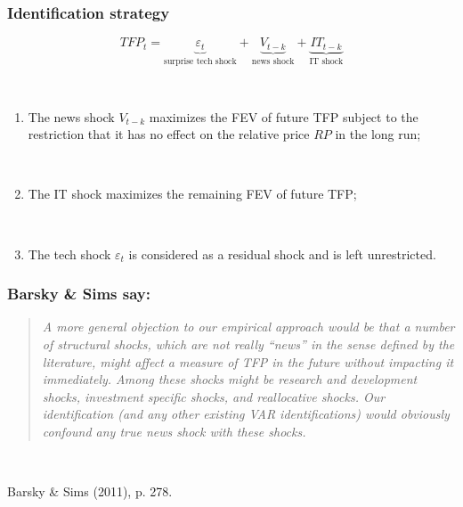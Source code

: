 \documentclass{beamer}
\begin{document}
\begin{frame}
	\frametitle{Identification strategy}

\begin{equation}
TFP_t =  \underbrace{\varepsilon_t}_\text{surprise tech shock}  + \underbrace{V_{t-k}}_\text{news shock} + \underbrace{IT_{t-k}}_\text{IT shock}  
\end{equation}

\

    \begin{enumerate}
    	\item The news shock $V_{t-k}$ maximizes the FEV of future TFP subject to the restriction that it has no effect on the relative price $RP$ in the long run;
	
	\
	
    \item The IT shock maximizes the remaining FEV of future TFP;
    
    \
    
    \item The tech shock $\varepsilon_t$ is considered as a residual shock and is left unrestricted.
   \end{enumerate}
	
	
\end{frame}







\begin{frame}
	\frametitle{Barsky \& Sims say:}
	\label{BS_quote}
	
\blockquote{\emph{A more general objection to our empirical approach would be that a number of structural shocks, which are not really ``news'' in the sense defined by the literature, might affect a measure of TFP in the future without impacting it immediately. Among these shocks might be research and development shocks, investment specific shocks, and reallocative shocks. Our identification (and any other existing VAR identifications) would obviously confound any true news shock with these shocks.}}

\

\hspace{5cm} Barsky \& Sims (2011), p. 278.

\

\

\
	
\hyperlink{related_lit}{}	
\end{frame}
\end{document}
